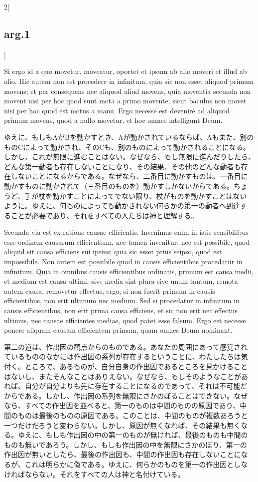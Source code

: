 \documentclass[paper=a4paper,fontsize=10pt,jafontsize=9pt,titlepage]{jlreq}
\begin{document}
\begin{paracol}{2}[\subsection{arg.1}]
\switchcolumn*

Si ergo id a quo movetur, moveatur, oportet et ipsum ab alio moveri et
illud ab alio. Hic autem non est procedere in infinitum, quia sic non
esset aliquod primum movens; et per consequens nec aliquod aliud
movens, quia moventia secunda non movent nisi per hoc quod sunt mota a
primo movente, sicut baculus non movet nisi per hoc quod est motus a
manu. Ergo necesse est devenire ad aliquod primum movens, quod a nullo
movetur, et hoc omnes intelligunt Deum.

\switchcolumn

ゆえに、もしもAがBを動かすとき、Aが動かされているならば、Aもまた、別の
ものCによって動かされ、そのCも、別のものによって動かされることになる。
しかし、これが無限に進むことはない。なぜなら、もし無限に進んだりしたら、
どんな第一動者も存在しないことになり、その結果、その他のどんな動者も存
在しないことになるからである。なぜなら、二番目に動かすものは、一番目に
動かすものに動かされて（三番目のものを）動かすしかないからである。ちょ
うど、手が杖を動かすことによってでない限り、杖がものを動かすことはない
ように。ゆえに、何ものによっても動かされない何らかの第一の動者へ到達す
ることが必要であり、それをすべての人たちは神と理解する。

\switchcolumn*

Secunda via est ex ratione causae efficientis. Invenimus enim in istis
sensibilibus esse ordinem causarum efficientium, nec tamen invenitur,
nec est possibile, quod aliquid sit causa efficiens sui ipsius; quia
sic esset prius seipso, quod est impossibile. Non autem est possibile
quod in causis efficientibus procedatur in infinitum. Quia in omnibus
causis efficientibus ordinatis, primum est causa medii, et medium est
causa ultimi, sive media sint plura sive unum tantum, remota autem
causa, removetur effectus, ergo, si non fuerit primum in causis
efficientibus, non erit ultimum nec medium. Sed si procedatur in
infinitum in causis efficientibus, non erit prima causa efficiens, et
sic non erit nec effectus ultimus, nec causae efficientes mediae, quod
patet esse falsum. Ergo est necesse ponere aliquam causam efficientem
primam, quam omnes Deum nominant.

\switchcolumn

第二の道は、作出因の観点からのものである。あなたの周囲にあって感覚され
ているもののなかには作出因の系列が存在するということに、わたしたちは気
付く。ところで、あるものが、自分自身の作出因であるところを見かけること
はないし、またそんなことはありえない。なぜなら、もしそのようなことがあ
れば、自分が自分よりも先に存在することになるのであって、それは不可能だ
からである。しかし、作出因の系列を無限にさかのぼることはできない。なぜ
なら、すべての作出因を並べると、第一のものは中間のものの原因であり、中
間のものは最後のものの原因である。このことは、中間のものが複数あろうと
一つだけだろうと変わらない。しかし、原因が無くなれば、その結果も無くな
る。ゆえに、もしも作出因の中の第一のものが無ければ、最後のものも中間の
ものも無いであろう。しかし、もしも作出因の中を無限にさかのぼり、第一の
作出因が無いとしたら、最後の作出因も、中間の作出因も存在しないことにな
るが、これは明らかに偽である。ゆえに、何らかのものを第一の作出因としな
ければならない。それをすべての人は神と名付けている。


\end{paracol}
\end{document}
